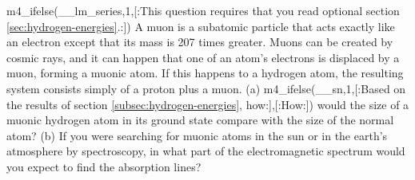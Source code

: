 m4_ifelse(__lm_series,1,[:This question requires that you read optional section \ref{sec:hydrogen-energies}.:])
A muon is a subatomic particle that acts exactly like
an electron except that its mass is 207 times greater. Muons
can be created by cosmic rays, and it can happen that one of
an atom's electrons is displaced by a muon, forming a muonic
atom. If this happens to a hydrogen atom, the resulting
system consists simply of a proton plus a muon.\hwendpart
 (a) 
m4_ifelse(__sn,1,[:Based on the results of section \ref{subsec:hydrogen-energies}, how:],[:How:])
would the size of a muonic hydrogen atom in its ground state
compare with the size of the normal atom?\hwendpart
 (b) If you were
searching for muonic atoms in the sun or in the earth's
atmosphere by spectroscopy, in what part of the electromagnetic
spectrum would you expect to find the absorption lines?
